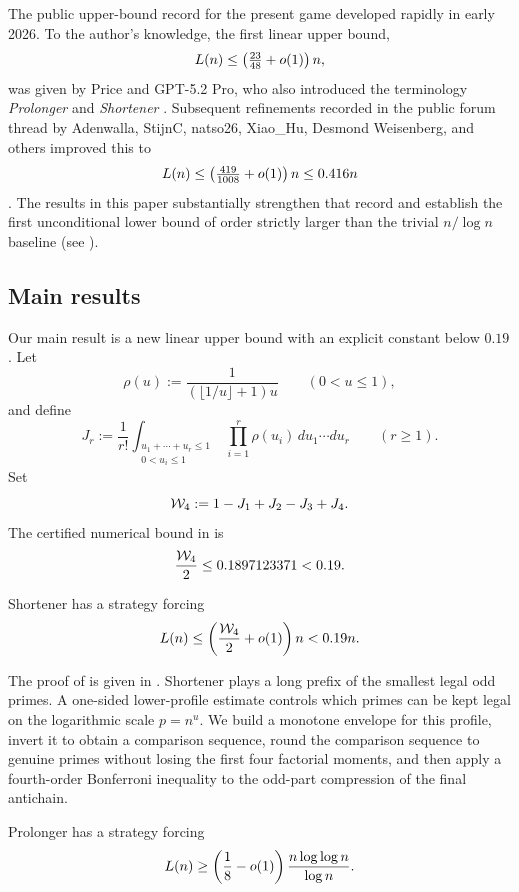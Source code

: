 The public upper-bound record for the present game developed rapidly in early
2026.  To the author's knowledge, the first linear upper bound,
\[
  L(n) \le \left(\tfrac{23}{48}+o(1)\right)n,
\]
was given by Price and GPT-5.2 Pro, who also introduced the terminology
\emph{Prolonger} and \emph{Shortener} \cite{PriceGPTPro26}.  Subsequent
refinements recorded in the public forum thread by Adenwalla, StijnC,
natso26, Xiao\_Hu, Desmond Weisenberg, and others improved this to
\[
  L(n) \le \left(\tfrac{419}{1008}+o(1)\right)n \le 0.416n
\]
\cite{Forum872}.  The results in this paper substantially strengthen that
record and establish the first unconditional lower bound of
order strictly larger than the trivial $n/\log n$ baseline (see
).

\subsection{Main results}

Our main result is a new linear upper bound with an explicit constant below
$0.19$.  Let
\[
  \rho(u):=\frac{1}{(\lfloor 1/u\rfloor+1)u}\qquad(0<u\le 1),
\]
and define
\[
  J_r:=
  \frac1{r!}
  \int_{\substack{u_1+\cdots+u_r\le1\\0<u_i\le1}}
  \prod_{i=1}^r \rho(u_i)\,du_1\cdots du_r
  \qquad (r\ge1).
\]
Set
\[
  \mathcal{W}_4:=1-J_1+J_2-J_3+J_4.
\]
The certified numerical bound in  is
\[
  \frac{\mathcal{W}_4}{2}\le0.1897123371<0.19.
\]

\begin{theorem}\label{thm:intro-main}
Shortener has a strategy forcing
\[
  L(n)\le \left(\frac{\mathcal{W}_4}{2}+o(1)\right)n<0.19n.
\]
\end{theorem}

The proof of  is given in .  Shortener
plays a long prefix of the smallest legal odd primes.  A one-sided lower-profile
estimate controls which primes can be kept legal on the logarithmic scale
$p=n^u$.  We build a monotone envelope for this profile, invert it to obtain a
comparison sequence, round the comparison sequence to genuine primes without
losing the first four factorial moments, and then apply a fourth-order
Bonferroni inequality to the odd-part compression of the final antichain.

\begin{theorem}\label{thm:intro-lower-bound}
Prolonger has a strategy forcing
\[
  L(n)\ge
  \left(\frac18-o(1)\right)\frac{n\log\log n}{\log n}.
\]
\end{theorem}

